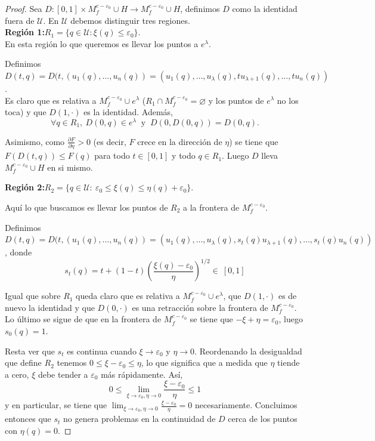 \begin{proof}
    Sea $D:[0,1]\times M_f^{c-\varepsilon_0}\cup H\to M_f^{c-\varepsilon_0}\cup H$, definimos $D$ como la identidad fuera de $\mathcal{U}$. En $\mathcal{U}$ debemos distinguir tres regiones.\\

    \textbf{Región 1:}\quad $R_1=\{q\in\mathcal{U}:\xi(q)\le \varepsilon_0\}$.\\
    
    En esta región lo que queremos es llevar los puntos a $e^{\lambda}$.

    Definimos $D(t,q)=D(t,(u_1(q),\dots,u_n(q))=(u_1(q),\dots,u_{\lambda}(q),tu_{\lambda+1}(q),\dots,tu_n(q))$.\\
    
    Es claro que es relativa a $M^{c-\varepsilon_0}_f\cup e^{\lambda}$ ($R_1\cap M^{c-\varepsilon_0}_f=\varnothing$ y los puntos de $e^{\lambda}$ no los toca) y que  $D(1,\cdot)$ es la identidad. Además,
    \begin{equation*}
        \forall q\in R_1, ~D(0, q)\in e^{\lambda} ~\text{ y }~ D(0,D(0,q))=D(0,q).
    \end{equation*} 

    Asimismo, como $\frac{\partial F}{\partial \eta}>0$ (es decir, $F$ crece en la dirección de $\eta$) se tiene que $F(D(t,q))\le F(q)$ para todo $t\in [0,1]$ y todo $q\in R_1$. Luego $D$ lleva $M_f^{c-\varepsilon_0}\cup H$ en si mismo.
    \bigskip

    \textbf{Región 2:}\quad $R_2=\{q\in \mathcal{U}:~ \varepsilon_0\le \xi(q)\le \eta(q)+\varepsilon_0\}$.
    \bigskip

    Aquí lo que buscamos es llevar los puntos de $R_2$ a la frontera de $M_f^{c-\varepsilon_0}$.

    Definimos $D(t,q)=D(t,(u_1(q),\dots,u_n(q))=(u_1(q),\dots,u_{\lambda}(q),s_t(q) u_{\lambda+1}(q),\dots,s_t(q) u_n(q))$, donde 
    \begin{equation*}
        s_t(q)=t + (1-t)\left(\frac{\xi(q)-\varepsilon_0}{\eta}\right)^{1/2} \in ~[0,1]
    \end{equation*}

    Igual que sobre $R_1$ queda claro que es relativa a $M_f^{c-\varepsilon_0}\cup e^{\lambda}$, que $D(1,\cdot)$ es de nuevo la identidad y que $D(0,\cdot)$ es una retracción sobre la frontera de $M_f^{c-\varepsilon_0}$. Lo último se sigue de que en la frontera de $M_f^{c-\varepsilon_0}$ se tiene que $-\xi +\eta = \varepsilon_0$, luego $s_0(q)=1$. 
    
    Resta ver que $s_t$ es continua cuando $\xi \to \varepsilon_0$ y $\eta \to 0$. Reordenando la desigualdad que define $R_2$ tenemos $0\le\xi-\varepsilon_0\le\eta$, lo que significa que a medida que $\eta$ tiende a cero, $\xi$ debe tender a $\varepsilon_0$ más rápidamente. Así, 
    \begin{equation*}
        0\le \lim_{\xi \to \varepsilon_0, \eta\to 0} \frac{\xi - \varepsilon_0}{\eta} \le 1
    \end{equation*}
    y en particular, se tiene que $\lim_{\xi \to \varepsilon_0, \eta\to 0} \frac{\xi - \varepsilon_0}{\eta}=0$ necesariamente. Concluimos entonces que $s_t$ no genera problemas en la continuidad de $D$ cerca de los puntos con $\eta(q)=0$.
    \bigskip


\end{proof}
